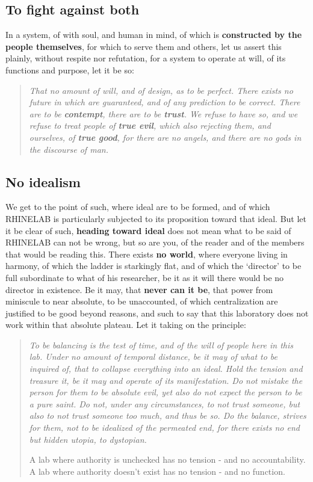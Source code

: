 \documentclass[10pt,a4paper]{article}
\begin{document}
\subsection{To fight against both}

In a system, of with soul, and human in mind, of which is \textbf{constructed by the people themselves}, for which to serve them and others, let us assert this plainly, without respite nor refutation, for a system to operate at will, of its functions and purpose, let it be so:
\begin{quote}
    \textit{That no amount of will, and of design, as to be perfect. There exists no future in which are guaranteed, and of any prediction to be correct. There are to be \textbf{contempt}, there are to be \textbf{trust}. We refuse to have so, and we refuse to treat people of \textbf{true evil}, which also rejecting them, and ourselves, of \textbf{true good}, for there are no angels, and there are no gods in the discourse of man.}
\end{quote}

\subsection{No idealism}

We get to the point of such, where ideal are to be formed, and of which RHINELAB is particularly subjected to its proposition toward that ideal. But let it be clear of such, \textbf{heading toward ideal} does not mean what to be said of RHINELAB can not be wrong, but so are you, of the reader and of the members that would be reading this. There exists \textbf{no world}, where everyone living in harmony, of which the ladder is starkingly flat, and of which the `director' to be full subordinate to what of his researcher, be it as it will there would be no director in existence. Be it may, that \textbf{never can it be}, that power from miniscule to near absolute, to be unaccounted, of which centralization are justified to be good beyond reasons, and such to say that this laboratory does not work within that absolute plateau. Let it taking on the principle:

\begin{quote}
    \textit{To be balancing is the test of time, and of the will of people here in this lab. Under no amount of temporal distance, be it may of what to be inquired of, that to collapse everything into an ideal. Hold the tension and treasure it, be it may and operate of its manifestation. Do not mistake the person for them to be absolute evil, yet also do not expect the person to be a pure saint. Do not, under any circumstances, to not trust someone, but also to not trust someone too much, and thus be so. Do the balance, strives for them, not to be idealized of the permeated end, for there exists no end but hidden utopia, to dystopian.}

    A lab where authority is unchecked has no tension - and no accountability. A lab where authority doesn't exist has no tension - and no function.
\end{quote}
\end{document}
